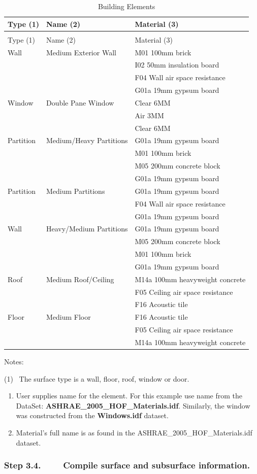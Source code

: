 \begin{longtable}[c]{@{}lll@{}}
\caption{Building Elements \label{table:building-elements}} \tabularnewline
\toprule
Type (1) & Name (2) & Material (3) \tabularnewline
\midrule
\endfirsthead

\caption[]{Building Elements} \tabularnewline
\toprule
Type (1) & Name (2) & Material (3) \tabularnewline
\midrule
\endhead

Wall & Medium Exterior Wall & M01 100mm brick \tabularnewline
~ & ~ & I02 50mm insulation board \tabularnewline
~ & ~ & F04 Wall air space resistance \tabularnewline
~ & ~ & G01a 19mm gypsum board \tabularnewline
Window & Double Pane Window & Clear 6MM \tabularnewline
~ & ~ & Air 3MM \tabularnewline
~ & ~ & Clear 6MM \tabularnewline
Partition & Medium/Heavy Partitions & G01a 19mm gypsum board \tabularnewline
~ & ~ & M01 100mm brick \tabularnewline
~ & ~ & M05 200mm concrete block \tabularnewline
~ & ~ & G01a 19mm gypsum board \tabularnewline
Partition & Medium Partitions & G01a 19mm gypsum board \tabularnewline
~ & ~ & F04 Wall air space resistance \tabularnewline
~ & ~ & G01a 19mm gypsum board \tabularnewline
Wall & Heavy/Medium Partitions & G01a 19mm gypsum board \tabularnewline
~ & ~ & M05 200mm concrete block \tabularnewline
~ & ~ & M01 100mm brick \tabularnewline
~ & ~ & G01a 19mm gypsum board \tabularnewline
Roof & Medium Roof/Ceiling & M14a 100mm heavyweight concrete \tabularnewline
~ & ~ & F05 Ceiling air space resistance \tabularnewline
~ & ~ & F16 Acoustic tile \tabularnewline
Floor & Medium Floor & F16 Acoustic tile \tabularnewline
~ & ~ & F05 Ceiling air space resistance \tabularnewline
~ & ~ & M14a 100mm heavyweight concrete \tabularnewline
\bottomrule
\end{longtable}

Notes:

(1)~ The surface type is a wall, floor, roof, window or door.

\begin{enumerate}
\def\labelenumi{(\arabic{enumi})}
\setcounter{enumi}{1}
\item
  User supplies name for the element. For this example use name from the DataSet: \textbf{ASHRAE\_2005\_HOF\_Materials.idf}. Similarly, the window was constructed from the \textbf{Windows.idf} dataset.
\item
  Material's full name is as found in the ASHRAE\_2005\_HOF\_Materials.idf dataset.
\end{enumerate}

\subsubsection{Step 3.4.~~~~ Compile surface and subsurface information.}\label{step-3.4.-compile-surface-and-subsurface-information.}

